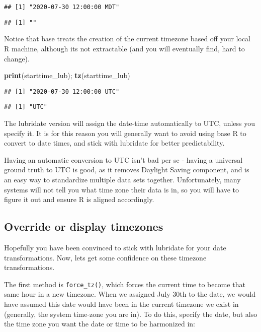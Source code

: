 \documentclass[
]{book}
\newenvironment{Shaded}{\begin{snugshade}}{\end{snugshade}}
\newcommand{\KeywordTok}[1]{\textcolor[rgb]{0.13,0.29,0.53}{\textbf{#1}}}
\newcommand{\NormalTok}[1]{#1}
\begin{document}
\begin{verbatim}
## [1] "2020-07-30 12:00:00 MDT"
\end{verbatim}

\begin{verbatim}
## [1] ""
\end{verbatim}

Notice that base treats the creation of the current timezone based off your local R machine, although its not extractable (and you will eventually find, hard to change).

\begin{Shaded}
\begin{Highlighting}[]
\KeywordTok{print}\NormalTok{(starttime_lub); }\KeywordTok{tz}\NormalTok{(starttime_lub)}
\end{Highlighting}
\end{Shaded}

\begin{verbatim}
## [1] "2020-07-30 12:00:00 UTC"
\end{verbatim}

\begin{verbatim}
## [1] "UTC"
\end{verbatim}

The lubridate version will assign the date-time automatically to UTC, unless you specify it. It is for this reason you will generally want to avoid using base R to convert to date times, and stick with lubridate for better predictability.

Having an automatic conversion to UTC isn't bad per se - having a universal ground truth to UTC is good, as it removes Daylight Saving component, and is an easy way to standardize multiple data sets together. Unfortunately, many systems will not tell you what time zone their data is in, so you will have to figure it out and ensure R is aligned accordingly.

\hypertarget{override-or-display-timezones}{%
\subsection{Override or display timezones}\label{override-or-display-timezones}}

Hopefully you have been convinced to stick with lubridate for your date transformations. Now, lets get some confidence on these timezone transformations.

The first method is \texttt{force\_tz()}, which forces the current time to become that same hour in a new timezone. When we assigned July 30th to the date, we would have assumed this date would have been in the current timezone we exist in (generally, the system time-zone you are in). To do this, specify the date, but also the time zone you want the date or time to be harmonized in:
\end{document}
